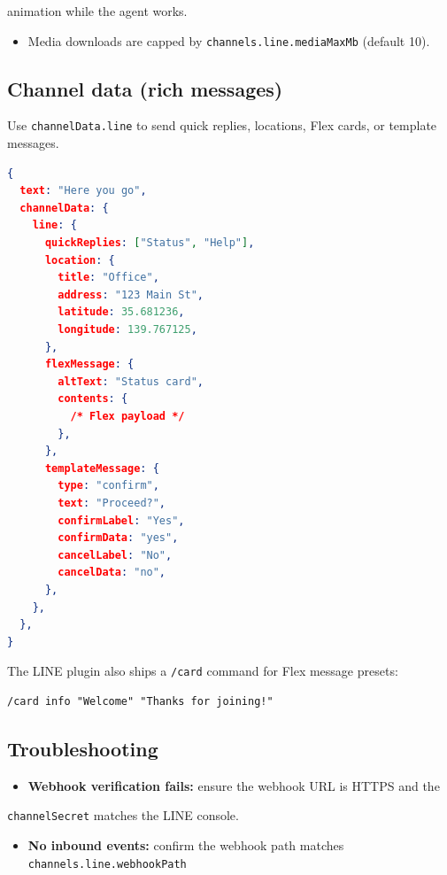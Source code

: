 animation while the agent works.
\begin{itemize}
  \item Media downloads are capped by \texttt{channels.line.mediaMaxMb} (default 10).
\end{itemize}


\subsection{Channel data (rich messages)}


Use \texttt{channelData.line} to send quick replies, locations, Flex cards, or template
messages.

\begin{lstlisting}[language=json]
{
  text: "Here you go",
  channelData: {
    line: {
      quickReplies: ["Status", "Help"],
      location: {
        title: "Office",
        address: "123 Main St",
        latitude: 35.681236,
        longitude: 139.767125,
      },
      flexMessage: {
        altText: "Status card",
        contents: {
          /* Flex payload */
        },
      },
      templateMessage: {
        type: "confirm",
        text: "Proceed?",
        confirmLabel: "Yes",
        confirmData: "yes",
        cancelLabel: "No",
        cancelData: "no",
      },
    },
  },
}
\end{lstlisting}


The LINE plugin also ships a \texttt{/card} command for Flex message presets:

\begin{lstlisting}
/card info "Welcome" "Thanks for joining!"
\end{lstlisting}


\subsection{Troubleshooting}


\begin{itemize}
  \item \textbf{Webhook verification fails:} ensure the webhook URL is HTTPS and the
\end{itemize}

\texttt{channelSecret} matches the LINE console.
\begin{itemize}
  \item \textbf{No inbound events:} confirm the webhook path matches \texttt{channels.line.webhookPath}
\end{itemize}

